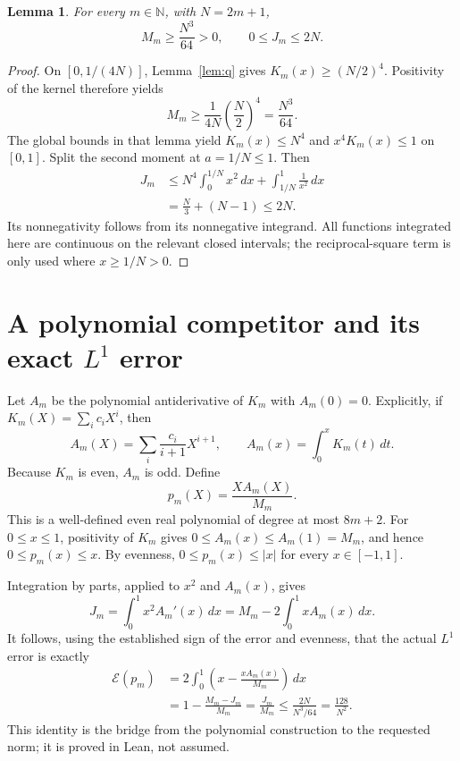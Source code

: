 \documentclass[11pt]{article}
\newtheorem{lemma}{Lemma}
\newcommand{\N}{\mathbb N}
\newcommand{\dd}{\,dx}
\begin{document}
\begin{lemma}\label{lem:moments}
For every $m\in\N$, with $N=2m+1$,
\[
 M_m\ge\frac{N^3}{64}>0,\qquad 0\le J_m\le2N.
\]
\end{lemma}
\begin{proof}
On $[0,1/(4N)]$, Lemma~\ref{lem:q} gives $K_m(x)\ge(N/2)^4$. Positivity of the kernel therefore yields
\[
 M_m\ge\frac{1}{4N}\left(\frac N2\right)^4=\frac{N^3}{64}.
\]
The global bounds in that lemma yield $K_m(x)\le N^4$ and $x^4K_m(x)\le1$ on $[0,1]$. Split the second moment at $a=1/N\le1$. Then
\begin{align*}
 J_m
 &\le N^4\int_0^{1/N}x^2\dd+\int_{1/N}^1\frac{1}{x^2}\dd\\
 &=\frac N3+(N-1)\le2N.
\end{align*}
Its nonnegativity follows from its nonnegative integrand. All functions integrated here are continuous on the relevant closed intervals; the reciprocal-square term is only used where $x\ge1/N>0$.
\end{proof}

\section{A polynomial competitor and its exact $L^1$ error}
Let $A_m$ be the polynomial antiderivative of $K_m$ with $A_m(0)=0$. Explicitly, if $K_m(X)=\sum_i c_iX^i$, then
\[
 A_m(X)=\sum_i\frac{c_i}{i+1}X^{i+1},\qquad
 A_m(x)=\int_0^x K_m(t)\,dt.
\]
Because $K_m$ is even, $A_m$ is odd. Define
\[
 p_m(X)=\frac{XA_m(X)}{M_m}.
\]
This is a well-defined even real polynomial of degree at most $8m+2$. For $0\le x\le1$, positivity of $K_m$ gives
$0\le A_m(x)\le A_m(1)=M_m$, and hence $0\le p_m(x)\le x$.
By evenness, $0\le p_m(x)\le|x|$ for every $x\in[-1,1]$.

Integration by parts, applied to $x^2$ and $A_m(x)$, gives
\[
 J_m=\int_0^1x^2 A_m'(x)\dd
 =M_m-2\int_0^1xA_m(x)\dd.
\]
It follows, using the established sign of the error and evenness, that the actual $L^1$ error is exactly
\begin{align*}
 \mathcal E(p_m)
 &=2\int_0^1\left(x-\frac{xA_m(x)}{M_m}\right)\dd\\
 &=1-\frac{M_m-J_m}{M_m}
 =\frac{J_m}{M_m}
 \le\frac{2N}{N^3/64}=\frac{128}{N^2}.
\end{align*}
This identity is the bridge from the polynomial construction to the requested norm; it is proved in Lean, not assumed.
\end{document}
